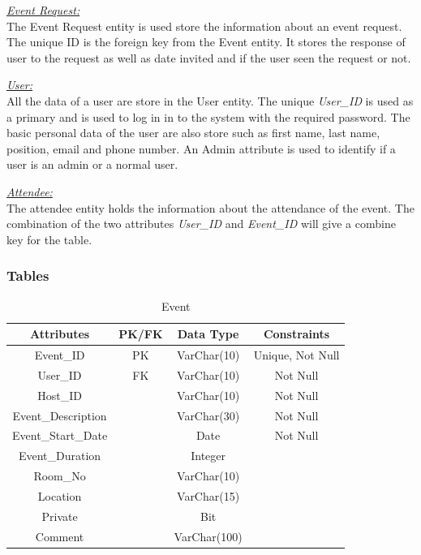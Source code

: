 \documentclass[a4paper]{article}
\begin{document}
\underline{\textit{Event Request:}} \\
The Event Request entity is used store the information about an event request. The unique ID is the foreign key from the Event entity. It stores the response of user to the request as well as date invited and if the user seen the request or not. 

\underline{\textit{User:}} \\
All the data of a user are store in the User entity. The unique \textit{User\_ID} is used as a primary and is used to log in in to the system with the required password. The basic personal data of the user are also store such as first name, last name, position, email and phone number. An Admin attribute is used to identify if a user is an admin or a normal user. 

\underline{\textit{Attendee:}} \\
The attendee entity holds the information about the attendance of the event. The combination of the two attributes \textit{User\_ID} and \textit{Event\_ID} will give a combine key for the table. 

\subsubsection{Tables}
\begin{table}[ht]
    \caption{Event}
    \centering
    \begin{tabular}{|c|c|c|c|}
        \hline
        Attributes & PK/FK & Data Type & Constraints  \\
        \hline
        Event\_ID & PK & VarChar(10) & Unique, Not Null \\
        \hline
        User\_ID & FK & VarChar(10) & Not Null \\
        \hline
        Host\_ID & & VarChar(10) & Not Null \\
        \hline
        Event\_Description & & VarChar(30) & Not Null \\
        \hline
        Event\_Start\_Date & & Date & Not Null \\
        \hline
        Event\_Duration & & Integer & \\
        \hline
        Room\_No & & VarChar(10) & \\
        \hline
        Location & & VarChar(15) & \\
        \hline
        Private & & Bit & \\
        \hline
        Comment & & VarChar(100) & \\
        \hline
    \end{tabular}
    \label{tab:event}
\end{table}
\end{document}
